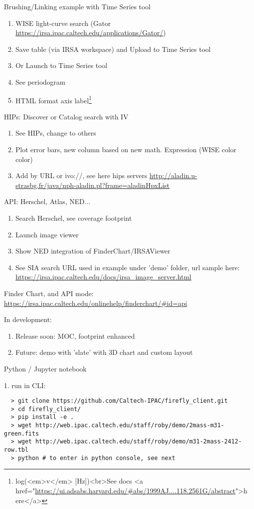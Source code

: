 \documentclass[11pt,twoside]{article}
\begin{document}
Brushing/Linking example with Time Series tool
\begin{enumerate}
  \item WISE light-curve search (Gator \url{https://irsa.ipac.caltech.edu/applications/Gator/})
  \item Save table (via IRSA workspace) and Upload to Time Series tool
  \item Or Launch to Time Series tool
  \item See periodogram
  \item HTML format axis label\footnote{log(<em>v</em> [Hz])<br>See docs <a href="\url{https://ui.adsabs.harvard.edu/\#abs/1999AJ....118.2561G/abstract}">here</a>}
\end{enumerate}
\smallskip
HIPs: Discover or Catalog search with IV

\begin{enumerate}
  \item See HIPs, change to others
  \item Plot error bars, new column based on new math. Expression (WISE color color)
  \item Add by URL or ivo://, see here hips servers \url{http://aladin.u-strasbg.fr/java/nph-aladin.pl?frame=aladinHpxList}
\end{enumerate}


API: Herschel, Atlas, NED...
\begin{enumerate}
  \item Search Herschel, see coverage footprint
  \item Launch image viewer
  \item Show NED integration of FinderChart/IRSAViewer
  \item See SIA search URL used in example under 'demo' folder, url sample here: \url{https://irsa.ipac.caltech.edu/docs/irsa_image_server.html}
\end{enumerate}
\smallskip
Finder Chart, and API mode: \url{https://irsa.ipac.caltech.edu/onlinehelp/finderchart/#id=api}

\smallskip
In development:
\begin{enumerate}
  \item Release soon: MOC, footprint enhanced
  \item Future:  demo with 'slate' with 3D chart and custom layout
\end{enumerate}

Python / Jupyter notebook

1. run in CLI:
\begin{verbatim}
  > git clone https://github.com/Caltech-IPAC/firefly_client.git
  > cd firefly_client/
  > pip install -e .
  > wget http://web.ipac.caltech.edu/staff/roby/demo/2mass-m31-green.fits
  > wget http://web.ipac.caltech.edu/staff/roby/demo/m31-2mass-2412-row.tbl
  > python # to enter in python console, see next
\end{verbatim}
\end{document}
